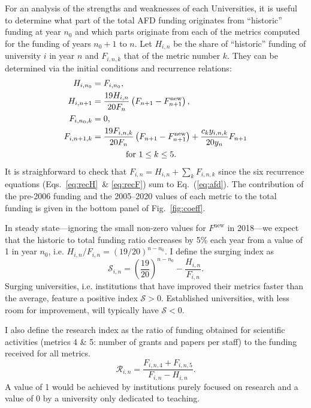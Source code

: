 \documentclass[twocolumn]{article}
\def\Fnew{\ensuremath{F^\text{new}}}
\begin{document}
For an analysis of the strengths and weaknesses of each Universities, it is useful to determine what part of the total AFD funding originates from ``historic'' funding at year $n_0$ and which parts originate from each of the metrics computed for the funding of years $n_0 + 1$ to $n$. Let $H_{i,n}$ be the share of ``historic'' funding of university $i$ in year $n$ and $F_{i,n,k}$ that of the metric number $k$. They can be determined via the initial conditions and recurrence relations:
\begin{subequations}
\begin{align}
  H_{i, n_0}  &= F_{i, n_0},\\
  H_{i,n+1}   &= \frac{19H_{i,n}}{20F_n}   \left(F_{n+1}-\Fnew_{n+1}\right),
                    \label{eq:recH}\\
  F_{i,n_0,k} &= 0,\\
  F_{i,n+1,k} &= \frac{19F_{i,n,k}}{20F_n} \left(F_{n+1} - \Fnew_{n+1}\right)
                  + \frac{c_k y_{i,n,k}}{20y_n} F_{n+1}
                    \label{eq:recF}\\
              &\qquad\qquad \text{for $1 \le k \le 5$}. \notag
\end{align}
\end{subequations}
It is straighforward to check that $F_{i,n} = H_{i,n} + \sum_k F_{i,n,k}$ since the six recurrence equations (Eqs.~\ref{eq:recH}~\& \ref{eq:recF}) sum to Eq.~(\ref{eq:afd}).  The contribution of the pre-2006 funding and the 2005--2020 values of each metric to the total funding is given in the bottom panel of Fig.~\ref{fig:coeff}.

In steady state---ignoring the small non-zero values for $\Fnew$ in 2018---we expect that the historic to total funding ratio decreases by 5\% each year from a value of 1 in year $n_0$, i.e. $H_{i,n} / F_{i,n} = (19/20)^{n-n_0}$. I define the surging index as
\begin{equation}
    \mathcal{S}_{i,n} = \left(\frac{19}{20}\right)^{n-n_0}
                             - \frac{H_{i,n}}{F_{i, n}}.
\end{equation}
Surging universities, i.e. institutions that have improved their metrics faster than the average, feature a positive index $\mathcal{S} > 0$.  Established universities, with less room for improvement, will typically have $\mathcal{S} < 0$.

I also define the research index as the ratio of funding obtained for scientific activities (metrics 4 \& 5: number of grants and papers per staff) to the funding received for all metrics.
\begin{equation}
    \mathcal{R}_{i,n} = \frac {F_{i,n,4} + F_{i,n,5}}
                            {F_{i,n} - H_{i,n}}.
\end{equation}
A value of 1 would be achieved by institutions purely focused on research and a value of 0 by a university only dedicated to teaching.
\end{document}
